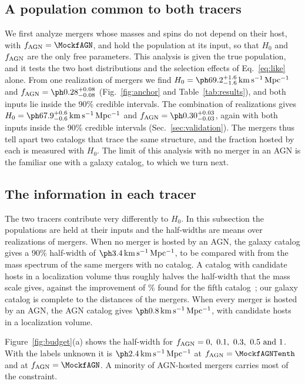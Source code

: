 \documentclass[aps,prd,reprint,amsmath,amssymb,nofootinbib]{revtex4-2}
\newcommand{\kmsMpc}{\,{\rm km\,s^{-1}\,Mpc^{-1}}}
\newcommand{\fAGN}{f_{\rm AGN}}
\begin{document}
\subsection{A population common to both tracers}
\label{sec:anchor}

We first analyze mergers whose masses and spins do not depend on their host, with $\fAGN=\MockfAGN$, and hold the population at its input, so that $H_0$ and $\fAGN$ are the only free parameters.
This analysis is given the true population, and it tests the two host distributions and the selection effects of Eq.~\eqref{eq:like} alone.
From one realization of \MockNev{} mergers we find $H_0=\IndAnchorHzero\kmsMpc$ and $\fAGN=\IndfAGNMix$ (Fig.~\ref{fig:anchor} and Table~\ref{tab:results}), and both inputs lie inside the 90\% credible intervals.
The combination of \NrealKnown{} realizations gives $H_0=\IndRecHzeroComb\kmsMpc$ and $\fAGN=\IndRecfAGNComb$, again with both inputs inside the 90\% credible intervals (Sec.~\ref{sec:validation}).
The mergers thus tell apart two catalogs that trace the same structure, and the fraction hosted by each is measured with $H_0$.
The limit of this analysis with no merger in an AGN is the familiar one with a galaxy catalog, to which we turn next.

\subsection{The information in each tracer}
\label{sec:budget}

The two tracers contribute very differently to $H_0$.
In this subsection the populations are held at their inputs and the half-widths are means over \IndNreal{} realizations of \MockNev{} mergers.
When no merger is hosted by an AGN, the galaxy catalog gives a 90\% half-width of $\IndHWGal\kmsMpc$, to be compared with \IndHWSpec{} from the mass spectrum of the same mergers with no catalog. %
A catalog with \PureGalHostsPerVol{} candidate hosts in a localization volume thus roughly halves the half-width that the mass scale gives, against the improvement of \IndLitFifthCatGain\% found for the fifth catalog~\cite{LIGOScientific:2026uyd}; our galaxy catalog is complete to the distances of the mergers. %
When every merger is hosted by an AGN, the AGN catalog gives $\IndHWAGN\kmsMpc$, with \PureAGNHostsPerVol{} candidate hosts in a localization volume.

Figure~\ref{fig:budget}(a) shows the half-width for $\fAGN=\IndfList$.
With the labels unknown it is $\IndHWMixTenth\kmsMpc$ at $\fAGN=\MockfAGNTenth$ and \IndHWMix{} at $\fAGN=\MockfAGN$. %
A minority of AGN-hosted mergers carries most of the constraint. %
\end{document}
